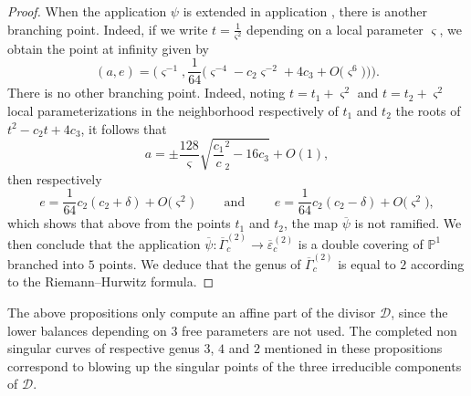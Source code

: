 \documentclass[pdftex]{sigma}
\numberwithin{equation}{section}
\begin{document}
\begin{proof}
 When the application $\psi$ is extended in application
 , there is another branching point. Indeed, if we write $t=\frac{1}{\varsigma^2}$ depending on a local parameter $\varsigma$, we obtain the point at infinity  given by
 \[(a,e)=\biggl(\varsigma^{-1},\frac{1}{64}\bigl(\varsigma^{-4}-
 c_2\varsigma^{-2}+4c_3+O\bigl(\varsigma^6\bigr)\bigr)\biggr).\]
 There is no other branching point. Indeed, noting
 $t=t_1+\varsigma^2$ and $t=t_2+\varsigma^2$ local parameterizations in the neighborhood respectively of $t_1$ and $t_2$ the roots of $t^2-c_2t+4c_3$, it follows that
 \[a=\pm\frac{128}{\varsigma}\sqrt{\frac{c_1} c_2^2-16c_3}+O (1 ),\] then respectively
 \[e=\frac{1}{64}c_2 (c_2+\delta )+O \bigl(\varsigma^2 \bigr) \qquad \text{ and } \qquad
 e= \frac{1}{64}c_2 (c_2-\delta )+O \bigl(\varsigma^2 \bigr),
 \] which shows that above from the points $t_1$ and $t_2$, the map $\overline{\psi}$ is not ramified. We then conclude that the application $\overline{\psi}\colon \overline{\Gamma}_c^{(2)} \longrightarrow
 \overline{\varepsilon}_c^{(2)}$ is a double covering of $\mathbb{P}^1$ branched into $5$ points. We deduce that the genus of $\overline{\Gamma}_c^{(2)}$ is equal to $2$ according to the Riemann--Hurwitz formula.
 \end{proof}

\begin{Remark}
The above propositions only compute an affine part of the divisor
$\mathcal{D}$, since the lower balances depending on $3$ free
parameters are not used. The completed non singular curves of
respective genus $3$, $4$ and $2$ mentioned in these propositions
correspond to blowing up the singular points of the three
irreducible components of $\mathcal{D}$.
\end{Remark}
\end{document}

